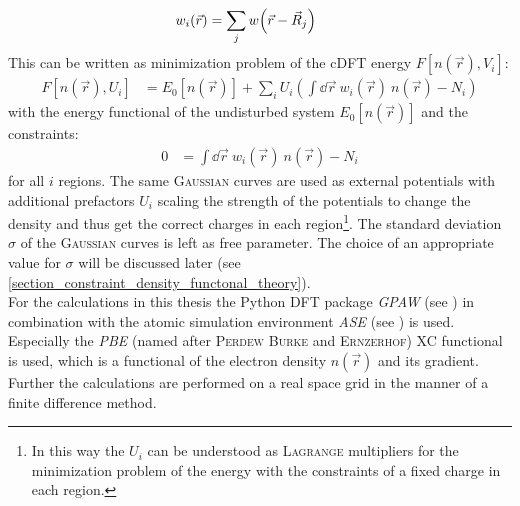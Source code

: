 \begin{align}
w_i\left(\vec{r}\right) &= \sum_j w\left(\vec{r} - \vec{R}_j\right) \text{\quad}
\end{align}
This can be written as minimization problem of the cDFT energy $F[n\left(\vec{r}\right), V_i]$:
\begin{align}
F\left[n\left(\vec{r}\right), U_i\right] &= E_0\left[n\left(\vec{r}\right)\right] + \sum_i U_i\left(\int\dd\vec{r}\ w_i\left(\vec{r}\right)\ n\left(\vec{r}\right) - N_i\right)
\end{align}
with the energy functional of the undisturbed system $E_0\left[n\left(\vec{r}\right)\right]$ and the constraints:
\begin{align}
0 &= \int\dd\vec{r}\ w_i\left(\vec{r}\right)\ n\left(\vec{r}\right) - N_i
\end{align}
for all $i$ regions.
The same \textsc{Gaussian} curves are used as external potentials with additional prefactors $U_i$ scaling the strength of the potentials to change the density and thus get the correct charges in each region\footnote{In this way the $U_i$ can be understood as \textsc{Lagrange} multipliers for the minimization problem of the energy with the constraints of a fixed charge in each region.}. The standard deviation $\sigma$ of the \textsc{Gaussian} curves is left as free parameter. The choice of an appropriate value for $\sigma$ will be discussed later (see \cref{section_constraint_density_functonal_theory}).\\
For the calculations in this thesis the Python DFT package \emph{GPAW} (see \cite{GPAW1, GPAW2}) in combination with the atomic simulation environment \emph{ASE} (see \cite{ASE}) is used. Especially the \emph{PBE} (named after \textsc{Perdew Burke} and \mbox{\textsc{Ernzerhof}}) XC functional is used, which is a functional of the electron density $n\left(\vec{r}\right)$  and its gradient. Further the calculations are performed on a real space grid in the manner of a finite difference method.
